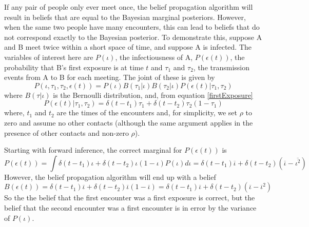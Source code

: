 \documentclass{article}
\begin{document}
If any pair of people only ever meet once, the belief propagation algorithm will result in beliefs that are equal to the Bayesian marginal posteriors. However, when the same two people have many encounters, this can lead to beliefs that do not correspond exactly to the Bayesian posterior. To demonstrate this, suppose A and B meet twice within a short space of time, and suppose A is infected. The variables of interest here are $P(\iota)$, the infectiousness of A, $P(\epsilon(t))$, the probability that B's first exposure is at time $t$ and $\tau_1$ and $\tau_2$, the transmission events from A to B for each meeting. The joint of these is given by
\[
P(\iota, \tau_1, \tau_2, \epsilon(t)) = P(\iota)B(\tau_1|\iota)B(\tau_2|\iota)P(\epsilon(t)|\tau_1,\tau_2)
\]
where $B(\tau|\iota)$ is the Bernoulli distribution, and, from equation \ref{firstExposure}
\[
P(\epsilon(t)|\tau_1,\tau_2) = \delta(t-t_1)\tau_1 + \delta(t-t_2)\tau_2(1-\tau_1)
\]
where, $t_1$ and $t_2$ are the times of the encounters and, for simplicity, we set $\rho$ to zero and assume no other contacts (although the same argument applies in the presence of other contacts and non-zero $\rho$).

Starting with forward inference, the correct marginal for $P(\epsilon(t))$ is
\[
P(\epsilon(t)) = \int \delta(t-t_1)\iota + \delta(t-t_2)\iota(1-\iota) P(\iota) d\iota = \delta(t-t_1)\overline{\iota} + \delta(t-t_2)\left(\overline{\iota} - \overline{\iota^2}\right) 
\]
However, the belief propagation algorithm will end up with a belief
\[
B(\epsilon(t)) = \delta(t-t_1)\overline{\iota} + \delta(t-t_2)\overline{\iota}(1-\overline{\iota}) = \delta(t-t_1)\overline{\iota} + \delta(t-t_2)\left(\overline{\iota}-\overline{\iota}^2\right)
\]
So the the belief that the first encounter was a first exposure is correct, but the belief that the second encounter was a first encounter is in error by the variance of $P(\iota)$.
\end{document}
